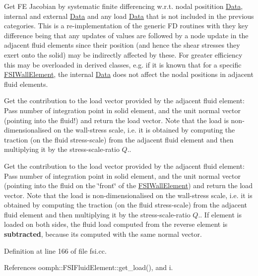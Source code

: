 Get FE Jacobian by systematic finite differencing w.\+r.\+t. nodal positition \hyperlink{classoomph_1_1Data}{Data}, internal and external \hyperlink{classoomph_1_1Data}{Data} and any load \hyperlink{classoomph_1_1Data}{Data} that is not included in the previous categories. This is a re-\/implementation of the generic FD routines with they key difference being that any updates of values are followed by a node update in the adjacent fluid elements since their position (and hence the shear stresses they exert onto the solid) may be indirectly affected by these. For greater efficiency this may be overloaded in derived classes, e.\+g. if it is known that for a specific \hyperlink{classoomph_1_1FSIWallElement}{F\+S\+I\+Wall\+Element}, the internal \hyperlink{classoomph_1_1Data}{Data} does not affect the nodal positions in adjacent fluid elements. 

Get the contribution to the load vector provided by the adjacent fluid element\+: Pass number of integration point in solid element, and the unit normal vector (pointing into the fluid!) and return the load vector. Note that the load is non-\/dimensionalised on the wall-\/stress scale, i.\+e. it is obtained by computing the traction (on the fluid stress-\/scale) from the adjacent fluid element and then multiplying it by the stress-\/scale-\/ratio $ Q. $.

Get the contribution to the load vector provided by the adjacent fluid element\+: Pass number of integration point in solid element, and the unit normal vector (pointing into the fluid on the \char`\"{}front\char`\"{} of the \hyperlink{classoomph_1_1FSIWallElement}{F\+S\+I\+Wall\+Element}) and return the load vector. Note that the load is non-\/dimensionalised on the wall-\/stress scale, i.\+e. it is obtained by computing the traction (on the fluid stress-\/scale) from the adjacent fluid element and then multiplying it by the stress-\/scale-\/ratio $ Q. $. If element is loaded on both sides, the fluid load computed from the reverse element is {\bfseries subtracted}, because it\textquotesingle{}s computed with the same normal vector. 

Definition at line 166 of file fsi.\+cc.



References oomph\+::\+F\+S\+I\+Fluid\+Element\+::get\+\_\+load(), and i.

\mbox{\label{classoomph_1_1FSIWallElement_a7a9552507bd4193dc3121a60453ed392}} 
